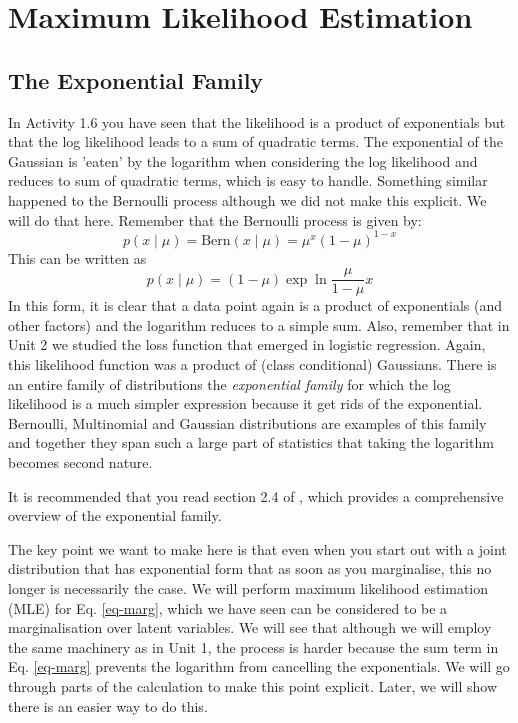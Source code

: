 \section{Maximum Likelihood Estimation}
\subsection{The Exponential Family}
In Activity 1.6 you have seen that the likelihood is a product of exponentials but that the log likelihood leads to a sum of quadratic terms. The exponential of
the Gaussian is 'eaten' by the logarithm when considering the log likelihood and reduces to sum of quadratic terms, which is easy to handle. Something similar
happened to the Bernoulli process although we did not make this explicit. We will do that here. Remember that the Bernoulli process is given
by:
$$
p(x \mid \mu)  = \mbox{Bern}(x \mid \mu) = \mu^x(1 - \mu)^{1-x}
$$
This can be written as
$$
p( x \mid \mu) = (1 - \mu) \exp{\ln \frac{\mu}{1-\mu}x}
$$
In this form, it is clear that a data point again is a product of exponentials (and other factors) and the  logarithm reduces to a simple sum. Also, remember
that in Unit 2 we studied the loss function that emerged in logistic regression. Again, this likelihood function was a product of (class conditional) Gaussians.
There is an entire  family of distributions the \emph{exponential family} for which the log likelihood is a much simpler expression because it get rids of the
exponential. Bernoulli, Multinomial and Gaussian distributions are examples of this family and together they span such a large part of statistics that
taking the logarithm becomes second nature.

It is recommended that you read section 2.4 of \cite{bishop2006}, which provides a comprehensive overview of the exponential family.


The key point we want to make here is that even when you start out with a joint distribution that has exponential form that as soon as you marginalise, this
no longer is necessarily the case. We will  perform maximum likelihood estimation (MLE) for Eq. \ref{eq-marg}, which we have seen
can be considered to be a marginalisation over latent variables. We will see that although we will employ the same machinery as in Unit 1, the process is harder
because the sum term in Eq. \ref{eq-marg} prevents the logarithm from cancelling the exponentials.  We will go through parts of the calculation to make this point explicit.
Later, we will show there is an easier way to do this.


